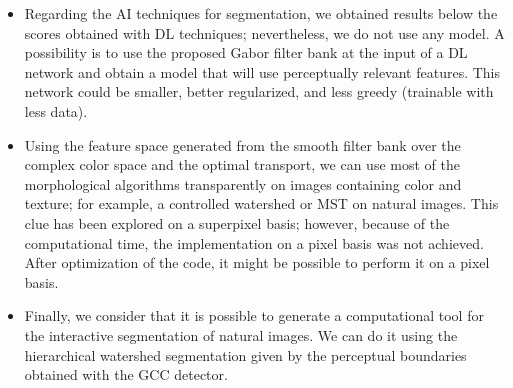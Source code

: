 \begin{itemize}
	 \item Regarding the AI techniques for segmentation, we obtained results below the scores obtained with DL techniques; nevertheless, we do not use any model. A possibility is to use the proposed Gabor filter bank at the input of a DL network and obtain a model that will use perceptually relevant features. This network could be smaller, better regularized, and less greedy (trainable with less data).
	 
	 \item Using the feature space generated from the smooth filter bank over the complex color space and the optimal transport, we can use most of the morphological algorithms transparently on images containing color and texture; for example, a controlled watershed or MST on natural images. This clue has been explored on a superpixel basis; however, because of the computational time, the implementation on a pixel basis was not achieved. After optimization of the code, it might be possible to perform it on a pixel basis.

	 \item Finally, we consider that it is possible to generate a computational tool for the interactive segmentation of natural images. We can do it using the hierarchical watershed segmentation given by the perceptual boundaries obtained with the GCC detector.
\end{itemize}


